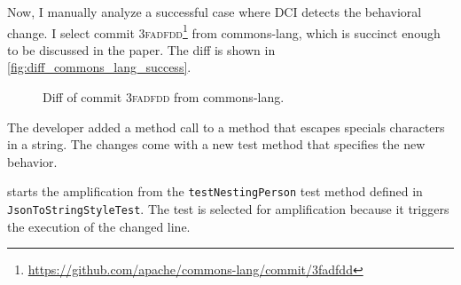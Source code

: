 Now, I manually analyze a successful case where DCI detects the behavioral change.
I select commit \textsc{3fadfdd}\footnote{\url{https://github.com/apache/commons-lang/commit/3fadfdd}} from commons-lang, which is succinct enough to be discussed in the paper.
The diff is shown in \autoref{fig:diff_commons_lang_success}.

\begin{figure}[h]
\centering
{}
\caption{Diff of commit \textsc{3fadfdd} from commons-lang.}
\label{fig:diff_commons_lang_success}
\end{figure}

The developer added a method call to a method that escapes specials characters in a string. 
The changes come with a new test method that specifies the new behavior.

\DCI starts the amplification from the \texttt{testNestingPerson} test method defined in \texttt{JsonToStringStyleTest}. 
The test is selected for amplification because it triggers the execution of the changed line.

